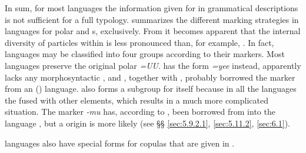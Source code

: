 In sum, for most  languages the information given for  in grammatical descriptions is not sufficient for a full typology.  summarizes the different  marking strategies in  languages for polar and s, exclusively. From  it becomes apparent that the internal diversity of  particles within  is less pronounced than, for example, . In fact,  languages may be classified into four groups according to their  markers. Most languages preserve the original polar  \textit{=UU}.  has the form \textit{=yee} instead,  apparently lacks any morphosyntactic , and , together with , probably borrowed the marker from an  () language.  also forms a subgroup for itself because in all the languages the  fused with other elements, which results in a much more complicated situation. The  marker \textit{-mu} has, according to \citet[384]{Sandman2012}, been borrowed from  into the  language , but a  origin is more likely (see §§ \ref{sec:5.9.2.1}, \ref{sec:5.11.2}, \ref{sec:6.1}).

 languages also have special  forms for copulas that are given in .

\begin{table}
\caption{Special interrogative copulas in  languages}
\label{tab:mong:13}

\end{table}

